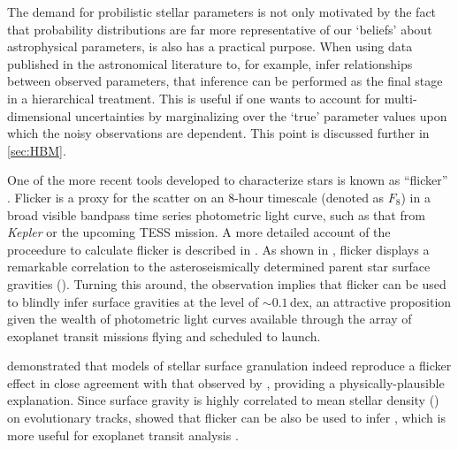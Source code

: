 The demand for probilistic stellar parameters is not only motivated by the fact
that probability distributions are far more representative of our `beliefs'
about astrophysical parameters, is also has a practical purpose.
When using data published in the astronomical literature to, for example, infer
relationships between observed parameters, that inference can be performed as
the final stage in a hierarchical treatment.
This is useful if one wants to account for multi-dimensional uncertainties by
marginalizing over the `true' parameter values upon which the noisy
observations are dependent.
This point is discussed further in \textsection\ref{sec:HBM}.



One of the more recent tools developed to characterize stars is known as
``flicker'' \citep{bastien:2013}. Flicker is a proxy for the scatter on an
8-hour timescale (denoted as $F_8$) in a broad visible bandpass time series
photometric light curve, such as that from \textit{Kepler} or the upcoming TESS
mission. A more detailed account of the proceedure to calculate flicker is
described in \citet{bastien:2013}. As shown in \citet{bastien:2013}, flicker
displays a remarkable correlation to the asteroseismically determined parent
star surface gravities (\logg). Turning this around, the observation implies
that flicker can be used to blindly infer surface gravities at the level of
$\sim0.1$\,dex, an attractive proposition given the wealth of photometric light
curves available through the array of exoplanet transit missions flying and
scheduled to launch.

\citet{cranmer:2014} demonstrated that models of stellar surface granulation
indeed reproduce a flicker effect in close agreement with that observed by
\citet{bastien:2013}, providing a physically-plausible explanation. Since
surface gravity is highly correlated to mean stellar density (\rhostar) on
evolutionary tracks, \citet{kipping:2014} showed that flicker can be also
be used to infer \rhostar, which is more useful for exoplanet transit
analysis \citep{seager:2003}.

